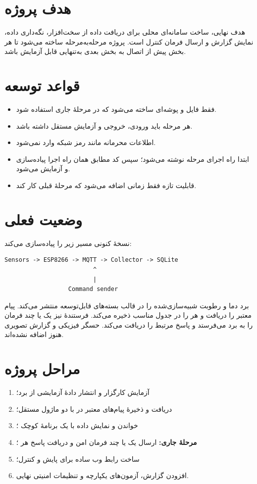 \section{هدف پروژه}
هدف نهایی، ساخت سامانه‌ای محلی برای دریافت داده از سخت‌افزار، نگه‌داری داده، نمایش گزارش و ارسال فرمان کنترل است. پروژه مرحله‌به‌مرحله ساخته می‌شود تا هر بخش پیش از اتصال به بخش بعدی به‌تنهایی قابل آزمایش باشد.

\section{قواعد توسعه}
\begin{itemize}
  \item فقط فایل و پوشه‌ای ساخته می‌شود که در مرحلهٔ جاری استفاده شود.
  \item هر مرحله باید ورودی، خروجی و آزمایش مستقل داشته باشد.
  \item اطلاعات محرمانه مانند رمز شبکه وارد
  نمی‌شود.
  \item ابتدا راه اجرای مرحله نوشته می‌شود؛ سپس کد مطابق همان راه اجرا پیاده‌سازی و آزمایش می‌شود.
  \item قابلیت تازه فقط زمانی اضافه می‌شود که مرحلهٔ قبلی کار کند.
\end{itemize}

\section{وضعیت فعلی}
نسخهٔ کنونی مسیر زیر را پیاده‌سازی می‌کند:

\begin{LTR}
\begin{lstlisting}
Sensors -> ESP8266 -> MQTT -> Collector -> SQLite
                         ^
                         |
                  Command sender
\end{lstlisting}
\end{LTR}

برد دما و رطوبت شبیه‌سازی‌شده را در قالب بسته‌های قابل‌توسعه منتشر می‌کند.
پیام معتبر را دریافت و هر
را در جدول مناسب ذخیره می‌کند.
فرستندهٔ
نیز یک یا چند فرمان را به برد می‌فرستد و پاسخ مرتبط را دریافت می‌کند. حسگر فیزیکی و گزارش تصویری هنوز اضافه نشده‌اند.

\section{مراحل پروژه}
\begin{enumerate}
  \item آزمایش کارگزار و انتشار دادهٔ آزمایشی از برد؛
  \item دریافت و ذخیرهٔ پیام‌های معتبر در
  با دو ماژول مستقل؛
  \item خواندن و نمایش داده با یک برنامهٔ کوچک
  ؛
  \item \textbf{مرحلهٔ جاری:} ارسال یک یا چند فرمان امن و دریافت پاسخ هر
  ؛
  \item ساخت رابط وب ساده برای پایش و کنترل؛
  \item افزودن گزارش، آزمون‌های یکپارچه و تنظیمات امنیتی نهایی.
\end{enumerate}

